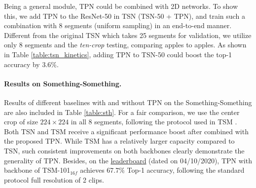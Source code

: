 \documentclass[10pt,twocolumn,letterpaper]{article}
\begin{document}
Being a general module, TPN could be combined with 2D networks.
To show this, we add TPN to the ResNet-50 \cite{resnet} in TSN (TSN-50 + TPN), and train such a combination with 8 segments (uniform sampling) in an end-to-end manner.
Different from the original TSN \cite{tsn} which takes 25 segments for validation, we utilize only 8 segments and the \emph{ten-crop} testing, comparing apples to apples.
As shown in Table \ref{table:tsn_kinetics}, adding TPN to TSN-50 could boost the top-1 accuracy by 3.6\%.


\paragraph{Results on Something-Something.}
\begin{table}[t]
    \begin{center}
    \end{center}
    \caption{
        \textbf{Results on the validation set of Something-Something V1 \& V2.} Note that results on V1 \& V2 take the center crop of 1 clip/video according to \cite{tsm}.
        }
    \label{table:sth}
\end{table}
Results of different baselines with and without TPN on the Something-Something are also included in Table \ref{table:sth}.
For a fair comparison, we use the center crop of size $224\times224$ in all 8 segments, following the protocol used in TSM \cite{tsm}.
Both TSN and TSM receive a significant performance boost after combined with the proposed TPN.
While TSM has a relatively larger capacity compared to TSN, such consistent improvements on both backbones clearly demonstrate the generality of TPN.
Besides, on the \href{https://20bn.com/datasets/something-something/v2}{leaderboard} (dated on 04/10/2020), TPN with backbone of TSM-101$_{16f}$ achieves 67.7\% Top-1 accuracy, following the standard protocol \ie full resolution of 2 clips.
\end{document}
